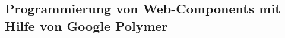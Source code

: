 \subsection{Programmierung von Web-Components mit Hilfe von Google Polymer}
\label{sec:4_WC_Polymer}